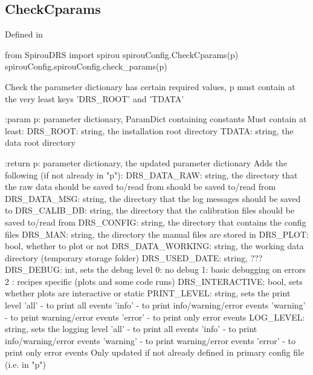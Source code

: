 \begin{minipage}{\textwidth}
\subsection{CheckCparams}

Defined in \spirouConfig{}

\begin{pythonbox}
from SpirouDRS import spirou
spirouConfig.CheckCparams(p)
spirouConfig.spirouConfig.check_params(p)
\end{pythonbox}

\begin{pythondocstring}
Check the parameter dictionary has certain required values, p must contain
at the very least keys 'DRS_ROOT' and 'TDATA'

:param p: parameter dictionary, ParamDict containing constants
    Must contain at least:
        DRS_ROOT: string, the installation root directory
        TDATA: string, the data root directory

:return p: parameter dictionary, the updated parameter dictionary
        Adds the following (if not already in "p"):
            DRS_DATA_RAW: string, the directory that the raw data should
                          be saved to/read from
                            should be saved to/read from
            DRS_DATA_MSG: string, the directory that the log messages
                          should be saved to
            DRS_CALIB_DB: string, the directory that the calibration
                          files should be saved to/read from
            DRS_CONFIG: string, the directory that contains the config files
            DRS_MAN: string, the directory the manual files are stored in
            DRS_PLOT: bool, whether to plot or not
            DRS_DATA_WORKING: string, the working data directory (temporary
                              storage folder)
            DRS_USED_DATE: string, ???
            DRS_DEBUG: int, sets the debug level
                            0: no debug
                            1: basic debugging on errors
                            2 : recipes specific (plots and some code runs)
            DRS_INTERACTIVE: bool, sets whether plots are interactive or
                             static
            PRINT_LEVEL: string, sets the print level
                               'all' - to print all events
                               'info' - to print info/warning/error events
                               'warning' - to print warning/error events
                               'error' - to print only error events
            LOG_LEVEL: string, sets the logging level
                               'all' - to print all events
                               'info' - to print info/warning/error events
                               'warning' - to print warning/error events
                               'error' - to print only error events
    Only updated if not already defined in primary config file
    (i.e. in "p")
\end{pythondocstring}
\end{minipage}

